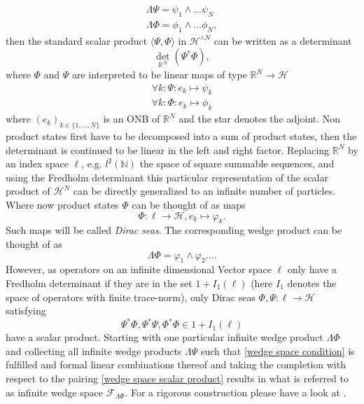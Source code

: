 \documentclass[b5paper,draft,openbib,12pt]{memoir}
\begin{document}
\begin{align}
  \mathsf{\Lambda}\Psi= \psi_1\wedge \dots \psi_N\\
  \mathsf{\Lambda}\Phi=\phi_1\wedge \dots \phi_N,
\end{align}
then the standard scalar product \(\langle \Psi,\Phi\rangle\)
in \(\mathcal{H}^{\wedge N}\) can be written as a determinant
\begin{equation}\label{wedge space scalar product}
  \det_{\mathbb{R}^N} (\Psi^* \Phi),
\end{equation}
where \(\Phi\) and \(\Psi\) are interpreted to be linear maps
of type \(\mathbb{R}^N\rightarrow \mathcal{H}\) 
\begin{align}
  \forall k: \Psi: e_k \mapsto \psi_k\\
  \forall k: \Phi: e_k \mapsto \phi_k
\end{align}
where \((e_k)_{k\in\{1,\dots, N\}}\) is an ONB 
of \(\mathbb{R}^N\) and the star denotes the adjoint. Non 
product states first have to be decomposed into a sum of 
product states, then the determinant is continued to be 
linear in the left and right factor. Replacing 
\(\mathbb{R}^N\) by an index space \(\ell\), e.g. \(l^2(\mathbb{N})\)
the space of square summable sequences,  and
using the Fredholm 
determinant this particular 
representation of the scalar product of \(\mathcal{H}^N\)
can be directly generalized to an infinite number of particles. 
Where now product states \(\Phi\) can be thought of as maps
\begin{equation}
  \Phi: \ell \rightarrow \mathcal{H}, e_k\mapsto \varphi_k.
\end{equation}
Such maps will be called \emph{Dirac seas}.
The corresponding wedge product can be thought of as 
\begin{equation}
  \mathsf{\Lambda}\Phi=\varphi_1\wedge \varphi_2\dots .
\end{equation}
However, as operators on an infinite dimensional 
Vector space \(\mathcal{\ell}\) only have a Fredholm determinant 
if they are in the set \(1+I_1(\mathcal{\ell})\) (here \(I_1\) 
denotes the space of operators with finite trace-norm), 
only Dirac seas 
\(\Phi,\Psi: \ell \rightarrow \mathcal{H}\) satisfying
\begin{equation}\label{wedge space condition}
\Psi^*\Phi,\Psi^*\Psi,\Phi^*\Phi\in 1+I_1(\ell)
\end{equation}
have a scalar product. 
Starting with one particular 
infinite wedge product \(\mathsf{\Lambda}\Phi\) and collecting all infinite 
wedge products \(\mathsf{\Lambda}\Psi\) such that \eqref{wedge space condition}
is fulfilled and formal linear combinations thereof and 
taking the completion with respect to 
the pairing \eqref{wedge space scalar product} results in 
what is referred to as infinite wedge space 
\(\mathcal{F}_{\mathsf{\Lambda} \Phi}\). For a rigorous construction 
please have a look at \cite[section 2.1]{ivp0}. 
\end{document}
